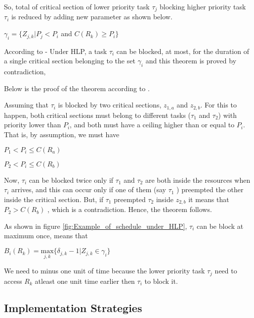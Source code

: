 So, total of critical section of lower priority task $\tau_{j}$ blocking higher priority task $\tau_{i}$ is reduced by adding new parameter as shown below.

\begin{center}
$ \gamma_{i}=\{Z_{j,k} | P_{j}<P_{i} $ and $ C(R_{k})\geq P_{i} \} $ \cite{b5}
\end{center}

According to \cite{b5} - Under HLP, a task $ \tau_{i} $ can be blocked, at most, for the duration of a single critical section belonging to the set $ \gamma_{i} $ and this theorem is proved by contradiction,  

Below is the proof of the theorem according to \cite{b5}.

Assuming that $ \tau_{i} $ is blocked by two critical sections, $ z_{1,a} $ and $ z_{2,b} $. 
For this to happen, both critical sections must belong to different tasks ($ \tau_{1} $ and $ \tau_{2} $) with priority lower than $ P_{i} $, and both must have a ceiling higher than or equal to $ P_{i} $. That is, by assumption, we must have

\begin{center}
$ P_{1}< P_{i}\leq C(R_{a})$

$ P_{2}< P_{i}\leq C(R_{b})$
\end{center}

Now, $ \tau_{i} $  can be blocked twice only if $ \tau_{1} $  and $ \tau_{2} $  are both inside the resources when $ \tau_{i} $ arrives, and this can occur only if one of them (say $ \tau_{1} $ ) preempted the other inside the critical section. But, if $ \tau_{1} $  preempted $ \tau_{2} $ inside $ z_{2,b} $  it means that $ P_{2}> C(R_{b}) $ , which is a contradiction. Hence, the theorem follows.

As shown in figure \ref{fig:Example_of_schedule_under_HLP}, $ \tau_{i} $ can be block at maximum once, means that

\begin{center}
$B_{i}(R_{k})=\underset{j,k}{\mathrm{max}} \{ \delta_{j,k}-1 | Z_{j,k} \in \gamma_{i}\}  $ \cite{b5}
\end{center}

We need to minus one unit of time because the lower priority task $ \tau_{j} $ need to access $ R_{k} $ atleast one unit time earlier then $ \tau_{i} $ to block it.

\subsection{Implementation Strategies} 

